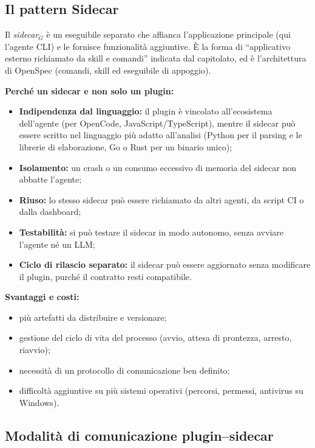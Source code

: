 \documentclass[a4paper, 11pt]{article}
\newcommand{\term}[1]{\textit{#1}$_G$} %
\begin{document}
\subsection{Il pattern Sidecar}
Il \term{sidecar} è un eseguibile separato che affianca l'applicazione principale (qui l'agente CLI) e le fornisce funzionalità aggiuntive. È la forma di ``applicativo esterno richiamato da skill e comandi'' indicata dal capitolato, ed è l'architettura di OpenSpec (comandi, skill ed eseguibile di appoggio).

\textbf{Perché un sidecar e non solo un plugin:}
\begin{itemize}[noitemsep]
    \item \textbf{Indipendenza dal linguaggio:} il plugin è vincolato all'ecosistema dell'agente (per OpenCode, JavaScript/TypeScript), mentre il sidecar può essere scritto nel linguaggio più adatto all'analisi (Python per il parsing e le librerie di elaborazione, Go o Rust per un binario unico);
    \item \textbf{Isolamento:} un crash o un consumo eccessivo di memoria del sidecar non abbatte l'agente;
    \item \textbf{Riuso:} lo stesso sidecar può essere richiamato da altri agenti, da script CI o dalla dashboard;
    \item \textbf{Testabilità:} si può testare il sidecar in modo autonomo, senza avviare l'agente né un LLM;
    \item \textbf{Ciclo di rilascio separato:} il sidecar può essere aggiornato senza modificare il plugin, purché il contratto resti compatibile.
\end{itemize}

\textbf{Svantaggi e costi:}
\begin{itemize}[noitemsep]
    \item più artefatti da distribuire e versionare;
    \item gestione del ciclo di vita del processo (avvio, attesa di prontezza, arresto, riavvio);
    \item necessità di un protocollo di comunicazione ben definito;
    \item difficoltà aggiuntive su più sistemi operativi (percorsi, permessi, antivirus su Windows).
\end{itemize}

\subsection{Modalità di comunicazione plugin--sidecar}
\end{document}
